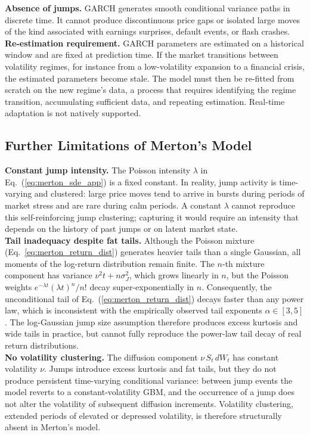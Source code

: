 \textbf{Absence of jumps.} GARCH generates smooth conditional variance paths in
discrete time. It cannot produce discontinuous price gaps or isolated large moves
of the kind associated with earnings surprises, default events, or flash crashes.\\

\textbf{Re-estimation requirement.} GARCH parameters are estimated on a
historical window and are fixed at prediction time. If the market transitions
between volatility regimes, for instance from a low-volatility expansion to a
financial crisis, the estimated parameters become stale. The model must then be
re-fitted from scratch on the new regime's data, a process that requires
identifying the regime transition, accumulating sufficient data, and repeating
estimation. Real-time adaptation is not natively supported.

\subsection{Further Limitations of Merton's Model}

\textbf{Constant jump intensity.} The Poisson intensity $\lambda$ in
Eq.~(\ref{eq:merton_sde_app}) is a fixed constant. In reality, jump activity is
time-varying and clustered: large price moves tend to arrive in bursts during
periods of market stress and are rare during calm periods. A constant $\lambda$
cannot reproduce this self-reinforcing jump clustering; capturing it would
require an intensity that depends on the history of past jumps or on latent
market state.\\

\textbf{Tail inadequacy despite fat tails.} Although the Poisson mixture
(Eq.~\ref{eq:merton_return_dist}) generates heavier tails than a single
Gaussian, all moments of the log-return distribution remain finite.
The $n$-th mixture component has variance $\nu^2 t + n\sigma_J^2$, which
grows linearly in $n$, but the Poisson weights $e^{-\lambda t}(\lambda t)^n/n!$
decay super-exponentially in $n$. Consequently, the unconditional tail of
Eq.~(\ref{eq:merton_return_dist}) decays faster than any power law, which is
inconsistent with the empirically observed tail exponents $\alpha \in [3,5]$
\cite{cont2001empirical}. The log-Gaussian jump size assumption therefore
produces excess kurtosis and wide tails in practice, but cannot fully reproduce
the power-law tail decay of real return distributions.\\

\textbf{No volatility clustering.} The diffusion component $\nu\, S_t\, dW_t$
has constant volatility $\nu$. Jumps introduce excess kurtosis and fat tails,
but they do not produce persistent time-varying conditional variance: between
jump events the model reverts to a constant-volatility GBM, and the occurrence
of a jump does not alter the volatility of subsequent diffusion increments.
Volatility clustering, extended periods of elevated or depressed volatility,
is therefore structurally absent in Merton's model.\\

